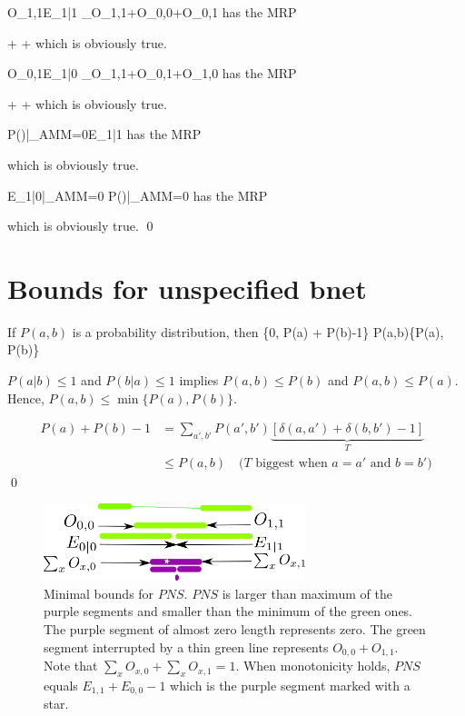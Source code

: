 \beq
O_{1,1}\leq E_{1|1} \leq 
{}
_{O_{1,1}+O_{0,0}+O_{0,1}}
\eeq
has the MRP


\beq
{}
\leq
{}
\leq
{}
+
+
\eeq
which is obviously true.

\beq
O_{0,1}\leq E_{1|0} \leq 
{}
_{O_{1,1}+O_{0,1}+O_{1,0}}
\eeq
has the MRP

\beq
{}
\leq
{}
\leq
{}
+
+
\eeq
which is obviously true.

\beq
P()|_{AMM=0}\leq E_{1|1}
\eeq
has the MRP 

\beq
{}
\leq
{}
\eeq
which is obviously true.

\beq
E_{1|0}|_{AMM=0}\leq
P()|_{AMM=0}
\eeq
has the MRP

\beq
{}
\leq
{}
\eeq
which is obviously true.
\qed



\section{Bounds for unspecified bnet}

\begin{claim}\label{cl-basic-bound-joint}
If $P(a,b)$ is a probability 
distribution, then
\beq
\max\{0, P(a) + P(b)-1\}\leq 
P(a,b)\leq \min\{P(a), P(b)\}
\eeq
\end{claim}
\proof
$P(a|b)\leq 1$ 
and $P(b|a)\leq 1$
implies $P(a,b)\leq P(b)$
and $P(a,b)\leq P(a)$.
Hence, $P(a,b)\leq \min\{P(a), P(b)\}$.

\begin{align}
P(a) + P(b) -1
&=
\sum_{a', b'} P(a',b')
\underbrace
{[\delta(a,a')+\delta(b,b')
-1]}_{T}
\\
&\leq
P(a,b)\quad 
\text{($T$ biggest
when $a=a'$ and $b=b'$)}
\end{align}
\qed


\begin{figure}[h!]
\centering
\includegraphics[width=3in]
{personalized/bounds-minimal.png}
\caption{Minimal bounds
for $PNS$.
$PNS$ is larger
than maximum of the purple segments
and smaller than the
minimum of the green ones.
The purple segment of almost zero
length represents zero.
The green segment 
interrupted by a thin green
line represents $O_{0,0} + O_{1,1}$.
Note that $\sum_x O_{x,0}+ 
\sum_x O_{x,1}=1$. When
monotonicity holds,
$PNS$ equals $E_{1,1}+E_{0,0}-1$
which is the purple
segment marked with a star.
} 
\label{fig-bounds-minimal}
\end{figure}


